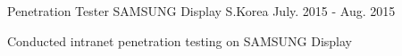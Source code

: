 \begin{cventries}
{\begin{cvitems}
      \end{cvitems}
    }
  \cventry
    {Penetration Tester}
    {SAMSUNG Display}
    {S.Korea}
    {July. 2015 - Aug. 2015}
    {
      \begin{cvitems}
        \item {Conducted intranet penetration testing on SAMSUNG Display}
      \end{cvitems} 
    }
\end{cventries}
